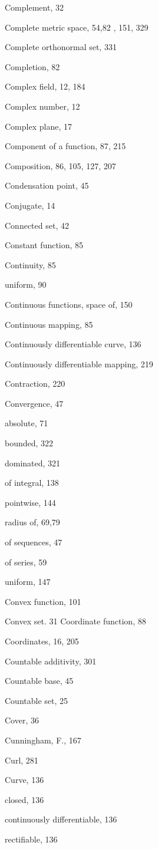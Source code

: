 \documentclass[10pt]{article}
\begin{document}
Complement, 32

Complete metric space, 54,82 , 151, 329

Complete orthonormal set, 331

Completion, 82

Complex field, 12, 184

Complex number, 12

Complex plane, 17

Component of a function, 87, 215

Composition, 86, 105, 127, 207

Condensation point, 45

Conjugate, 14

Connected set, 42

Constant function, 85

Continuity, 85

uniform, 90

Continuous functions, space of, 150

Continuous mapping, 85

Continuously differentiable curve, 136

Continuously differentiable mapping, 219

Contraction, 220

Convergence, 47

absolute, 71

bounded, 322

dominated, 321

of integral, 138

pointwise, 144

radius of, 69,79

of sequences, 47

of series, 59

uniform, 147

Convex function, 101

Convex set. 31 Coordinate function, 88

Coordinates, 16, 205

Countable additivity, 301

Countable base, 45

Countable set, 25

Cover, 36

Cunningham, F., 167

Curl, 281

Curve, 136

closed, 136

continuously differentiable, 136

rectifiable, 136
\end{document}
